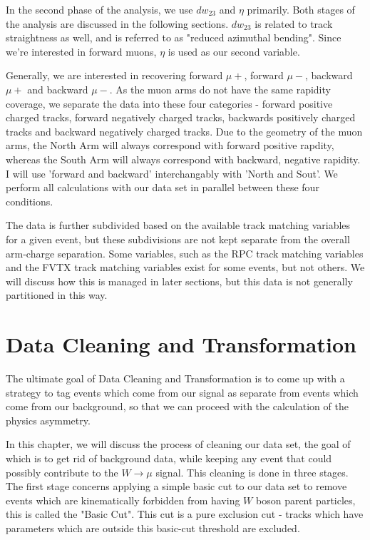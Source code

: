 In the second phase of the analysis, we use $dw_{23}$ and $\eta$ primarily. Both
stages of the analysis are discussed in the following sections. $dw_{23}$ is
related to track straightness as well, and is referred to as "reduced azimuthal
bending". Since we're interested in forward muons, $\eta$ is used as our second
variable.

Generally, we are interested in recovering forward $\mu+$, forward $\mu-$,
backward $\mu+$ and backward $\mu-$. As the muon arms do not have the same
rapidity coverage, we separate the data into these four categories - forward
positive charged tracks, forward negatively charged tracks, backwards positively
charged tracks and backward negatively charged tracks. Due to the geometry of
the muon arms, the North Arm will always correspond with forward positive
rapdity, whereas the South Arm will always correspond with backward, negative
rapidity. I will use 'forward and backward' interchangably with 'North and
Sout'. We perform all calculations with our data set in parallel between these
four conditions.

The data is further subdivided based on the available track matching variables
for a given event, but these subdivisions are not kept separate from the
overall arm-charge separation. Some variables, such as the RPC track matching
variables and the FVTX track matching variables exist for some events, but not
others. We will discuss how this is managed in later sections, but this data is
not generally partitioned in this way.

\clearpage
\section{Data Cleaning and Transformation}
The ultimate goal of Data Cleaning and Transformation is to come up with a
strategy to tag events which come from our signal as separate from events which
come from our background, so that we can proceed with the calculation of the
physics asymmetry.

In this chapter, we will discuss the process of cleaning our data set, the goal
of which is to get rid of background data, while keeping any event that could
possibly contribute to the $W\rightarrow\mu$ signal. This cleaning is done in
three stages. The first stage concerns applying a simple basic cut to our data
set to remove events which are kinematically forbidden from having $W$ boson
parent particles, this is called the "Basic Cut". This cut is a pure exclusion
cut - tracks which have parameters which are outside this basic-cut threshold
are excluded.

